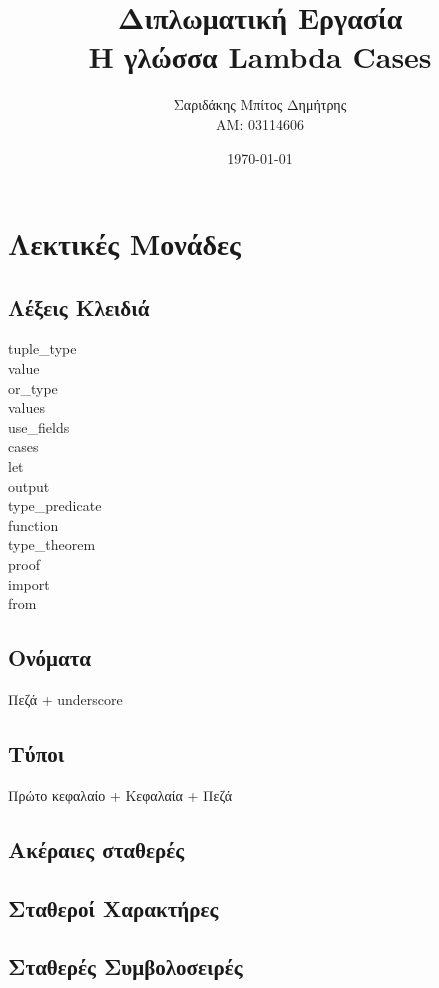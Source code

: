 \documentclass{article}
\date{\today}
\author{
  Σαριδάκης Μπίτος Δημήτρης
\\ΑM: 03114606
}
\def\e{\foreignlanguage{english}}
\def\LC{\e{Lambda Cases}}
\begin{document}
\title{
  \textbf{Διπλωματική Εργασία}
\\\textbf{Η γλώσσα \LC}
}
\maketitle

\section{Λεκτικές Μονάδες}

\subsection{Λέξεις Κλειδιά}

\e{
  tuple\_type \\ value \\
  or\_type \\ values \\
  use\_fields \\ cases \\
  let \\ output \\
  type\_predicate \\
  function \\
  type\_theorem \\
  proof \\
  import \\
  from 
}

\subsection{Ονόματα}

Πεζά + \e{underscore}

\subsection{Τύποι}

Πρώτο κεφαλαίο + Κεφαλαία + Πεζά

\subsection{Ακέραιες σταθερές}

\subsection{Σταθεροί Χαρακτήρες}

\subsection{Σταθερές Συμβολοσειρές}
\end{document}
